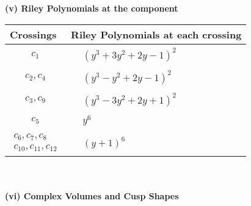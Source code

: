 \documentclass[1p]{elsarticle_modified}
\theoremstyle{definition}
\begin{document}
\newpage\renewcommand{\arraystretch}{1}
\flushleft \textbf{(v) Riley Polynomials at the component}\newline \\
\begin{tabular}{m{50pt}|m{274pt}}
Crossings & \hspace{64pt}Riley Polynomials at each crossing \\
\hline $$\begin{aligned}c_{1}\end{aligned}$$&$\begin{aligned}
&(y^3+3 y^2+2 y-1)^2
\end{aligned}$\\
\hline $$\begin{aligned}c_{2},c_{4}\end{aligned}$$&$\begin{aligned}
&(y^3- y^2+2 y-1)^2
\end{aligned}$\\
\hline $$\begin{aligned}c_{3},c_{9}\end{aligned}$$&$\begin{aligned}
&(y^3-3 y^2+2 y+1)^2
\end{aligned}$\\
\hline $$\begin{aligned}c_{5}\end{aligned}$$&$\begin{aligned}
&y^6
\end{aligned}$\\
\hline $$\begin{aligned}c_{6},c_{7},c_{8}\\c_{10},c_{11},c_{12}\end{aligned}$$&$\begin{aligned}
&(y+1)^6
\end{aligned}$\\
\hline
\end{tabular}\\~\\
\newpage\flushleft \textbf{(vi) Complex Volumes and Cusp Shapes}
\end{document}
